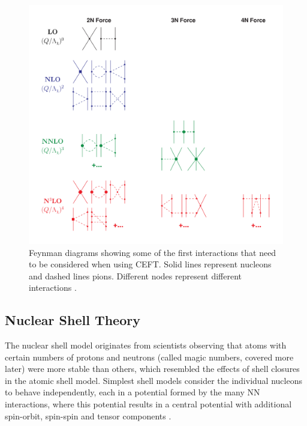 \begin{figure}[H]
    \centering
    \includegraphics[width=.4\textwidth]{images/NFT_diagram.png}
    \caption{Feynman diagrams showing some of the first interactions that need to be considered when using CEFT. Solid lines represent nucleons and dashed lines pions. Different nodes represent different interactions \cite{machleidt_chiral_2011}.}\label{fig:diagram1}
\end{figure}

\subsection{Nuclear Shell Theory}
The nuclear shell model originates from scientists observing that atoms with certain numbers of protons and neutrons (called magic numbers, covered more later) were more stable than others, which resembled the effects of shell closures in the atomic shell model.
Simplest shell models consider the individual nucleons to behave independently, each in a potential formed by the many NN interactions, where this potential results in a central potential with additional spin-orbit, spin-spin and tensor components \cite{kruecken_introduction_2011}.




